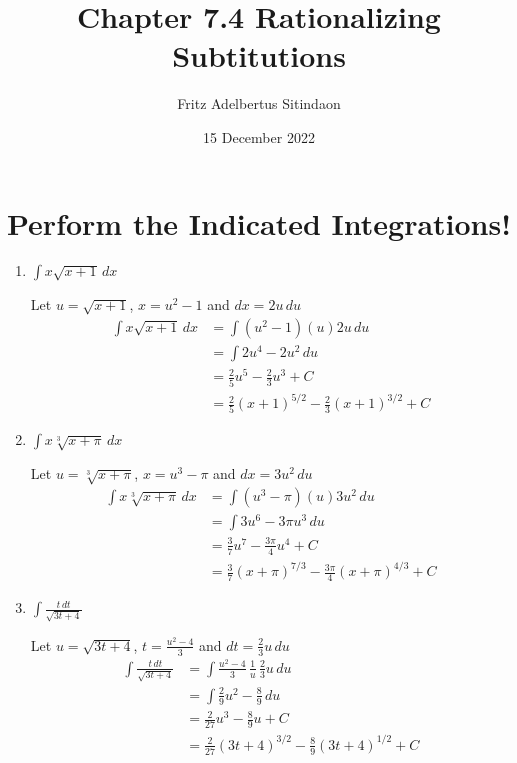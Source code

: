 \documentclass[12pt]{article}
\title{Chapter 7.4 Rationalizing Subtitutions}
\author{Fritz Adelbertus Sitindaon}
\date{15 December 2022}
\begin{document}
\maketitle

\section{Perform the Indicated Integrations!}  
  
\begin{enumerate}
\item $\displaystyle\int x\sqrt{x+1}\,dx$

Let $u=\sqrt{x+1}$, $x=u^{2}-1$ and $dx=2u\,du$
\begin{equation*}
  \begin{aligned}
  \int x\sqrt{x+1}\,dx &= \int (u^{2}-1)(u)2u\,du\\
  &=\int 2u^{4}-2u^{2}\,du\\
  &=\frac{2}{5}u^{5}-\frac{2}{3}u^{3}+C\\
  &=\frac{2}{5}(x+1)^{5/2}-\frac{2}{3}(x+1)^{3/2}+C
  \end{aligned}
\end{equation*}

\item $\displaystyle\int x\sqrt[3]{x+\pi}\,dx$

Let $u=\sqrt[3]{x+\pi}$, $x=u^{3}-\pi$ and $dx=3u^{2}\,du$
\begin{equation*}
  \begin{aligned}
  \int x\sqrt[3]{x+\pi}\,dx &= \int(u^{3}-\pi)(u)3u^{2}\,du\\
  &=\int 3u^{6}-3\pi u^{3}\,du\\
  &=\frac{3}{7}u^{7}-\frac{3\pi}{4}u^{4}+C\\
  &=\frac{3}{7}(x+\pi)^{7/3}-\frac{3\pi}{4}(x+\pi)^{4/3}+C
  \end{aligned}
\end{equation*}

\item $\displaystyle\int\frac{t\,dt}{\sqrt{3t+4}}$

Let $u=\sqrt{3t+4}$, $t=\displaystyle\frac{u^{2}-4}{3}$ and $dt=\displaystyle\frac{2}{3}u\,du$
\begin{equation*}
  \begin{aligned}
  \int\frac{t\,dt}{\sqrt{3t+4}} &= \int\frac{u^{2}-4}{3}\,\frac{1}{u}\,\frac{2}{3}u\,du\\
  &=\int\frac{2}{9}u^{2}-\frac{8}{9}\,du\\
  &=\frac{2}{27}u^{3}-\frac{8}{9}u+C\\
  &=\frac{2}{27}(3t+4)^{3/2}-\frac{8}{9}(3t+4)^{1/2}+C
  \end{aligned}
\end{equation*}


\end{enumerate}
\end{document}
